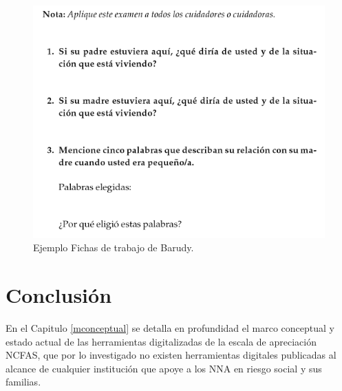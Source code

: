 \begin{figure}[htb]
	\label{Figura8}
	\begin{center}
		\includegraphics[scale=0.6]{imagenes/fichabarudy.png}
	\end{center}
	\caption{Ejemplo Fichas de trabajo de Barudy.}
\end{figure}
 
 \clearpage
 \newpage
 
\section{Conclusión}

En el Capitulo \ref{mconceptual} se detalla en profundidad el marco conceptual y estado actual de las herramientas digitalizadas de la escala de apreciación NCFAS, que por lo investigado no existen herramientas digitales publicadas al alcance de cualquier institución que apoye a los NNA en riesgo social y sus familias.